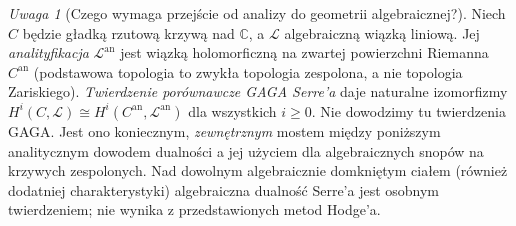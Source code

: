 \documentclass[11pt,a4paper,openany]{report}
\numberwithin{equation}{section}
\theoremstyle{plain}
\theoremstyle{definition}
\theoremstyle{remark}
\newtheorem{uwaga}[twierdzenie]{Uwaga}
\newcommand{\C}{\mathbb C}
\begin{document}
\begin{uwaga}[Czego wymaga przejście od analizy do geometrii algebraicznej?]
Niech $C$ będzie gładką rzutową krzywą nad $\C$, a
$\mathcal L$ algebraiczną wiązką liniową. Jej
\emph{analityfikacja} $\mathcal L^{\mathrm{an}}$ jest
wiązką holomorficzną na zwartej powierzchni Riemanna
$C^{\mathrm{an}}$ (podstawowa topologia to zwykła
topologia zespolona, a nie topologia Zariskiego).
\emph{Twierdzenie porównawcze GAGA Serre'a} daje
naturalne izomorfizmy
$H^i(C,\mathcal L)\cong
H^i(C^{\mathrm{an}},\mathcal L^{\mathrm{an}})$
dla wszystkich $i\ge0$. Nie dowodzimy tu twierdzenia
GAGA. Jest ono koniecznym, \emph{zewnętrznym}
mostem między poniższym analitycznym dowodem dualności
a jej użyciem dla algebraicznych snopów na krzywych
zespolonych. Nad dowolnym algebraicznie domkniętym
ciałem (również dodatniej charakterystyki)
algebraiczna dualność Serre'a jest osobnym twierdzeniem;
nie wynika z przedstawionych metod Hodge'a.
\end{uwaga}
\end{document}
